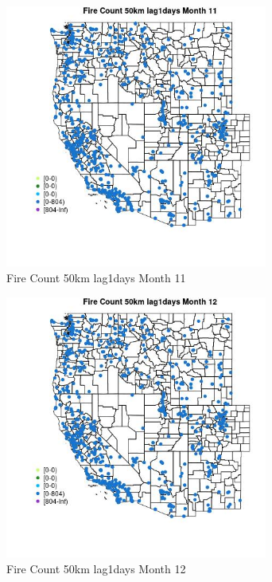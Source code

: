 \begin{figure} 
\centering  
\includegraphics[width=0.77\textwidth]{Code_Outputs/Report_ML_input_PM25_Step4_part_f_de_duplicated_aveswNAs_MapObsMo11Fire_Count_50km_lag1days.jpg} 
\caption{\label{fig:Report_ML_input_PM25_Step4_part_f_de_duplicated_aveswNAsMapObsMo11Fire_Count_50km_lag1days}Fire Count 50km lag1days Month 11} 
\end{figure} 
 

\begin{figure} 
\centering  
\includegraphics[width=0.77\textwidth]{Code_Outputs/Report_ML_input_PM25_Step4_part_f_de_duplicated_aveswNAs_MapObsMo12Fire_Count_50km_lag1days.jpg} 
\caption{\label{fig:Report_ML_input_PM25_Step4_part_f_de_duplicated_aveswNAsMapObsMo12Fire_Count_50km_lag1days}Fire Count 50km lag1days Month 12} 
\end{figure} 
 


